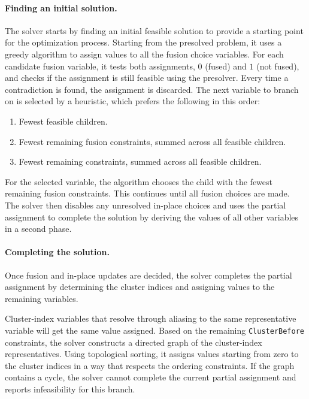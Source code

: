 \paragraph{Finding an initial solution.}

The solver starts by finding an initial feasible solution to provide a starting point for the optimization process.
Starting from the presolved problem, it uses a greedy algorithm to assign values to all the fusion choice variables.
For each candidate fusion variable, it tests both assignments, $0$ (fused) and $1$ (not fused), and checks if the assignment is still feasible using the presolver.
Every time a contradiction is found, the assignment is discarded.
The next variable to branch on is selected by a heuristic, which prefers the following in this order:

\begin{enumerate}
    \item Fewest feasible children.
    \item Fewest remaining fusion constraints, summed across all feasible children.
    \item Fewest remaining constraints, summed across all feasible children.
\end{enumerate}

For the selected variable, the algorithm chooses the child with the fewest remaining fusion constraints.
This continues until all fusion choices are made.
The solver then disables any unresolved in-place choices and uses the partial assignment to complete the solution by deriving the values of all other variables in a second phase.

\paragraph{Completing the solution.}

Once fusion and in-place updates are decided, the solver completes the partial assignment by determining the cluster indices and assigning values to the remaining variables.

Cluster-index variables that resolve through aliasing to the same representative variable will get the same value assigned.
Based on the remaining \texttt{ClusterBefore} constraints, the solver constructs a directed graph of the cluster-index representatives.
Using topological sorting, it assigns values starting from zero to the cluster indices in a way that respects the ordering constraints.
If the graph contains a cycle, the solver cannot complete the current partial assignment and reports infeasibility for this branch.

